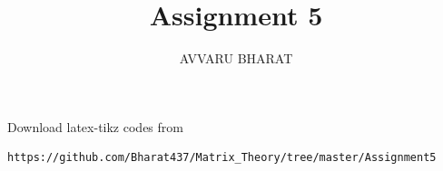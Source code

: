 \documentclass[journal,12pt,twocolumn]{IEEEtran}
\DeclareMathOperator*{\Res}{Res}
\begin{document}
\newtheorem{theorem}{Theorem}[section]
\newtheorem{problem}{Problem}
\newtheorem{proposition}{Proposition}[section]
\newtheorem{lemma}{Lemma}[section]
\newtheorem{corollary}[theorem]{Corollary}
\newtheorem{example}{Example}[section]
\newtheorem{definition}[problem]{Definition}

\newcommand{\BEQA}{\begin{eqnarray}}
\newcommand{\EEQA}{\end{eqnarray}}
\newcommand{\define}{\stackrel{\triangle}{=}}

\providecommand{\mbf}{\mathbf}
\providecommand{\pr}[1]{\ensuremath{\Pr\left(#1\right)}}
\providecommand{\qfunc}[1]{\ensuremath{Q\left(#1\right)}}
\providecommand{\sbrak}[1]{\ensuremath{{}\left[#1\right]}}
\providecommand{\lsbrak}[1]{\ensuremath{{}\left[#1\right.}}
\providecommand{\rsbrak}[1]{\ensuremath{{}\left.#1\right]}}
\providecommand{\brak}[1]{\ensuremath{\left(#1\right)}}
\providecommand{\lbrak}[1]{\ensuremath{\left(#1\right.}}
\providecommand{\rbrak}[1]{\ensuremath{\left.#1\right)}}
\providecommand{\cbrak}[1]{\ensuremath{\left\{#1\right\}}}
\providecommand{\lcbrak}[1]{\ensuremath{\left\{#1\right.}}
\providecommand{\rcbrak}[1]{\ensuremath{\left.#1\right\}}}
\theoremstyle{remark}
\newtheorem{rem}{Remark}
\newcommand{\sgn}{\mathop{\mathrm{sgn}}}
\providecommand{\abs}[1]{\left\vert#1\right\vert}
\providecommand{\res}[1]{\Res\displaylimits_{#1}} 
\providecommand{\norm}[1]{\left\lVert#1\right\rVert}
\providecommand{\mtx}[1]{\mathbf{#1}}
\providecommand{\mean}[1]{E\left[ #1 \right]}
\providecommand{\fourier}{\overset{\mathcal{F}}{ \rightleftharpoons}}
\providecommand{\system}{\overset{\mathcal{H}}{ \longleftrightarrow}}
\newcommand{\solution}{\noindent \textbf{Solution: }}
\newcommand{\cosec}{\,\text{cosec}\,}
\providecommand{\dec}[2]{\ensuremath{\overset{#1}{\underset{#2}{\gtrless}}}}
\newcommand{\myvec}[1]{\ensuremath{\begin{pmatrix}#1\end{pmatrix}}}
\newcommand{\mydet}[1]{\ensuremath{\begin{vmatrix}#1\end{vmatrix}}}
\makeatletter
{}
\makeatother
\let\StandardTheFigure\thefigure
\let\vec\mathbf
\renewcommand{\thefigure}{\theproblem}
\def\putbox#1#2#3{\makebox[0in][l]{\makebox[#1][l]{}\raisebox{\baselineskip}[0in][0in]{\raisebox{#2}[0in][0in]{#3}}}}
     \def\rightbox#1{\makebox[0in][r]{#1}}
     \def\centbox#1{\makebox[0in]{#1}}
     \def\topbox#1{\raisebox{-\baselineskip}[0in][0in]{#1}}
     \def\midbox#1{\raisebox{-0.5\baselineskip}[0in][0in]{#1}}
\vspace{3cm}
\title{Assignment 5}
\author{AVVARU BHARAT}
\maketitle
\newpage
\bigskip
\renewcommand{\thefigure}{1}
\renewcommand{\thetable}{\theenumi}
Download latex-tikz codes from 
%
\begin{lstlisting}
https://github.com/Bharat437/Matrix_Theory/tree/master/Assignment5
\end{lstlisting}
\end{document}
